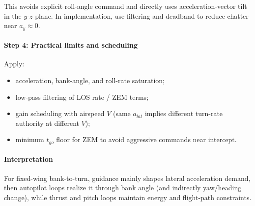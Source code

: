 \documentclass[11pt,a4paper]{article}
\begin{document}
This avoids explicit roll-angle command and directly uses acceleration-vector tilt in the $y$-$z$ plane. In implementation, use filtering and deadband to reduce chatter near $a_y\approx 0$.

\paragraph{Step 4: Practical limits and scheduling}
Apply:
\begin{itemize}
    \item acceleration, bank-angle, and roll-rate saturation;
    \item low-pass filtering of LOS rate / ZEM terms;
    \item gain scheduling with airspeed $V$ (same $a_{lat}$ implies different turn-rate authority at different $V$);
    \item minimum $t_{go}$ floor for ZEM to avoid aggressive commands near intercept.
\end{itemize}

\paragraph{Interpretation}
For fixed-wing bank-to-turn, guidance mainly shapes lateral acceleration demand, then autopilot loops realize it through bank angle (and indirectly yaw/heading change), while thrust and pitch loops maintain energy and flight-path constraints.
\end{document}
